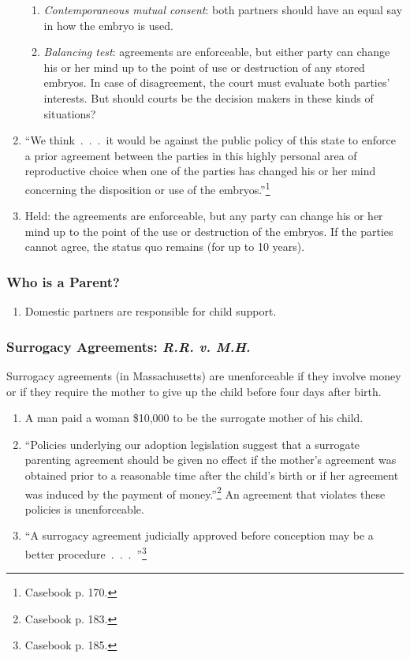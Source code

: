 \begin{enumerate}
\begin{enumerate}
        \item \emph{Contemporaneous mutual consent}: both partners should have 
        an equal say in how the embryo is used.
        \item \emph{Balancing test}: agreements are enforceable, but either 
        party can change his or her mind up to the point of use or destruction 
        of any stored embryos. In case of disagreement, the court must 
        evaluate both parties' interests. But should courts be the decision 
        makers in these kinds of situations?
    \end{enumerate}
    \item ``We think~.~.~.~it would be against the public policy of this state 
    to enforce a prior agreement between the parties in this highly personal 
    area of reproductive choice when one of the parties has changed his or her 
    mind concerning the disposition or use of the embryos.''\footnote{Casebook 
    p. 170.}
    \item Held: the agreements are enforceable, but any party can change his 
    or her mind up to the point of the use or destruction of the embryos. If 
    the parties cannot agree, the status quo remains (for up to 10 years).
\end{enumerate}

\subsubsection{Who is a Parent?}

\begin{enumerate}
    \item Domestic partners are responsible for child support.
\end{enumerate}

\subsubsection{Surrogacy Agreements: \emph{R.R. v. M.H.}}

Surrogacy agreements (in Massachusetts) are unenforceable if they involve 
money or if they require the mother to give up the child before four days 
after birth.

\begin{enumerate}
    \item A man paid a woman \$10,000 to be the surrogate mother of his child.
    \item ``Policies underlying our adoption legislation suggest that a 
    surrogate parenting agreement should be given no effect if the mother's 
    agreement was obtained prior to a reasonable time after the child's birth 
    or if her agreement was induced by the payment of 
    money.''\footnote{Casebook p. 183.} An agreement that violates these 
    policies is unenforceable.
    \item ``A surrogacy agreement judicially approved before conception may be 
    a better procedure~.~.~.~''\footnote{Casebook p. 185.}
\end{enumerate}

